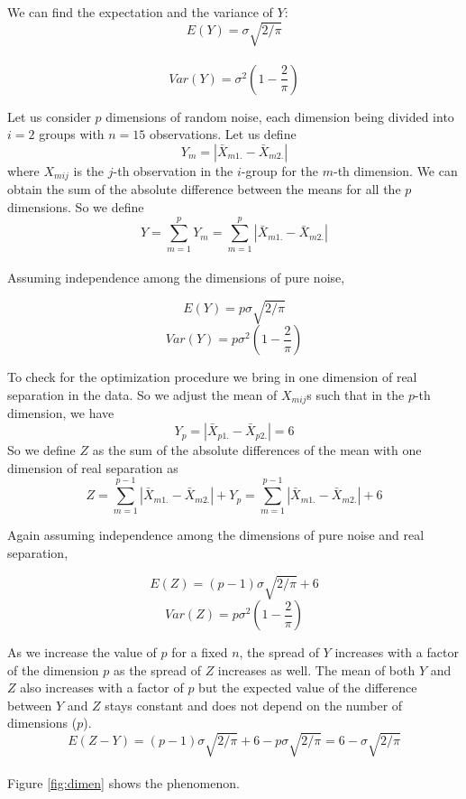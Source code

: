 \documentclass[12]{article}
\begin{document}
We can find the expectation and the variance of $Y$: 
$$E(Y) = \sigma \sqrt{2/\pi}$$ \\
$$Var(Y) = \sigma^2 (1 - \frac{2}{\pi})$$

Let us consider $p$ dimensions of random noise, each dimension being divided into $i = 2$ groups with $n = 15$ observations. Let us define $$Y_m = |\bar{X}_{m1.} - \bar{X}_{m2.}|$$ where $X_{mij}$ is the $j$-th observation in the $i$-group for the $m$-th dimension. We can obtain the sum of the absolute difference between the means for all the $p$ dimensions. So we define $$Y = \sum_{m=1}^p Y_m = \sum_{m=1}^p |\bar{X}_{m1.} - \bar{X}_{m2.}| $$ \\

Assuming independence among the dimensions of pure noise,

$$E(Y) = p \sigma \sqrt{2/\pi}$$
$$Var(Y) = p \sigma^2 (1 - \frac{2}{\pi})$$

To check for the optimization procedure we bring in one dimension of real separation in the data. So we adjust the mean of $X_{mij}$s such that in the $p$-th dimension, we have $$Y_p = |\bar{X}_{p1.} - \bar{X}_{p2.}| = 6$$ So we define $Z$ as the sum of the absolute differences of the mean with one dimension of real separation as $$Z = \sum_{m=1}^{p-1} |\bar{X}_{m1.} - \bar{X}_{m2.}| + Y_p = \sum_{m=1}^{p-1} |\bar{X}_{m1.} - \bar{X}_{m2.}| + 6$$

Again assuming independence among the dimensions of pure noise and real separation,

$$E(Z) = (p - 1) \sigma \sqrt{2/\pi} + 6$$
$$Var(Z) = p \sigma^2 (1 - \frac{2}{\pi})$$

As we increase the value of $p$ for a fixed $n$, the spread of $Y$ increases with a factor of the dimension $p$ as the spread of $Z$ increases as well. The mean of both $Y$ and $Z$ also increases with a factor of $p$ but the expected value of the difference between $Y$ and $Z$ stays constant and does not depend on the number of dimensions ($p$). 
$$E (Z - Y) = (p - 1) \sigma \sqrt{2/\pi} + 6 - p \sigma \sqrt{2/\pi} = 6 - \sigma \sqrt{2/\pi}$$ \\
 Figure \ref{fig:dimen} shows the phenomenon.  \\
\end{document}
